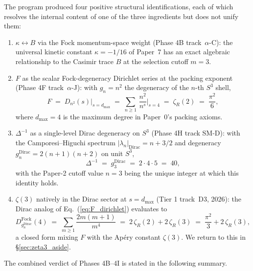 The program produced four positive structural identifications, each of
which resolves the internal content of one of the three ingredients but
does not unify them:
\begin{enumerate}
  \item $\kappa \leftrightarrow B$ via the Fock momentum-space weight
    (Phase 4B track~$\alpha$-C): the universal kinetic constant
    $\kappa = -1/16$ of Paper~7 has an exact algebraic relationship to
    the Casimir trace $B$ at the selection cutoff $m=3$.
  \item $F$ as the scalar Fock-degeneracy Dirichlet series at the
    packing exponent (Phase 4F track~$\alpha$-J): with $g_n = n^2$ the
    degeneracy of the $n$-th $S^3$ shell,
    \begin{equation}\label{eq:F_dirichlet}
      F \;=\; D_{n^2}(s)\Big|_{s = d_{\max}}
        \;=\; \sum_{n\geq 1}\,\frac{n^2}{n^{s}}\Bigg|_{s=4}
        \;=\; \zeta_R(2) \;=\; \frac{\pi^2}{6},
    \end{equation}
    where $d_{\max}=4$ is the maximum degree in Paper~0's packing
    axioms.
  \item $\Delta^{-1}$ as a single-level Dirac degeneracy on $S^3$
    (Phase 4H track SM-D): with the Camporesi--Higuchi spectrum
    $|\lambda_n|_{\text{Dirac}} = n + 3/2$ and degeneracy
    $g_n^{\text{Dirac}} = 2(n+1)(n+2)$ on unit $S^3$,
    \begin{equation}\label{eq:Delta_dirac}
      \Delta^{-1} \;=\; g_3^{\text{Dirac}} \;=\; 2 \cdot 4 \cdot 5 \;=\; 40,
    \end{equation}
    with the Paper-2 cutoff value $n=3$ being the unique integer at
    which this identity holds.
  \item $\zeta(3)$ natively in the Dirac sector at $s = d_{\max}$
    (Tier 1 track~D3, 2026): the Dirac analog of
    Eq.~(\ref{eq:F_dirichlet}) evaluates to
    \begin{equation}\label{eq:D_dirac_zeta3}
      D_{g_n^{\text{Dirac}}}^{\text{Fock}}(4)
      \;=\; \sum_{m\geq 1}\frac{2m(m+1)}{m^4}
      \;=\; 2\,\zeta_R(2) + 2\,\zeta_R(3)
      \;=\; \frac{\pi^2}{3} + 2\,\zeta_R(3),
    \end{equation}
    a closed form mixing $F$ with the Apéry constant $\zeta(3)$. We
    return to this in \S\ref{sec:zeta3_aside}.
\end{enumerate}

The combined verdict of Phases 4B--4I is stated in the following
summary.


